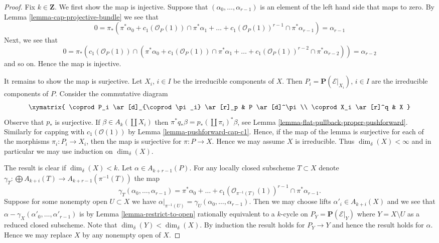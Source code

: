\begin{proof}
Fix $k \in \mathbf{Z}$. We first show the map is injective.
Suppose that $(\alpha_0, \ldots, \alpha_{r - 1})$ is an element
of the left hand side that maps to zero.
By Lemma \ref{lemma-cap-projective-bundle} we see that
$$
0 = \pi_*(\pi^*\alpha_0 +
c_1(\mathcal{O}_P(1)) \cap \pi^*\alpha_1
+ \ldots +
c_1(\mathcal{O}_P(1))^{r - 1} \cap \pi^*\alpha_{r-1})
= \alpha_{r - 1}
$$
Next, we see that
$$
0 = \pi_*(c_1(\mathcal{O}_P(1)) \cap (\pi^*\alpha_0 +
c_1(\mathcal{O}_P(1)) \cap \pi^*\alpha_1
+ \ldots +
c_1(\mathcal{O}_P(1))^{r - 2} \cap \pi^*\alpha_{r - 2}))
= \alpha_{r - 2}
$$
and so on. Hence the map is injective.

\medskip\noindent
It remains to show the map is surjective.
Let $X_i$, $i \in I$ be the irreducible components of $X$.
Then $P_i = \mathbf{P}(\mathcal{E}|_{X_i})$, $i \in I$
are the irreducible components of $P$. Consider the commutative
diagram
$$
\xymatrix{
\coprod P_i \ar[d]_{\coprod \pi_i} \ar[r]_p & P \ar[d]^\pi \\
\coprod X_i \ar[r]^q & X
}
$$
Observe that $p_*$ is surjective. If $\beta \in A_k(\coprod X_i)$
then $\pi^* q_* \beta = p_*(\coprod \pi_i)^* \beta$, see
Lemma \ref{lemma-flat-pullback-proper-pushforward}. Similarly for
capping with $c_1(\mathcal{O}(1))$ by
Lemma \ref{lemma-pushforward-cap-c1}.
Hence, if the map of the lemma is surjective for each
of the morphisms $\pi_i : P_i \to X_i$, then the map is
surjective for $\pi : P \to X$. Hence we may assume $X$ is irreducible.
Thus $\dim_\delta(X) < \infty$ and in particular we may use
induction on $\dim_\delta(X)$.

\medskip\noindent
The result is clear if $\dim_\delta(X) < k$.
Let $\alpha \in A_{k + r - 1}(P)$.
For any locally closed subscheme $T \subset X$ denote
$\gamma_T : \bigoplus A_{k + i}(T) \to A_{k + r - 1}(\pi^{-1}(T))$
the map
$$
\gamma_T(\alpha_0, \ldots, \alpha_{r - 1})
= \pi^*\alpha_0 + \ldots +
c_1(\mathcal{O}_{\pi^{-1}(T)}(1))^{r - 1} \cap \pi^*\alpha_{r - 1}.
$$
Suppose for some nonempty open $U \subset X$ we have
$\alpha|_{\pi^{-1}(U)} = \gamma_U(\alpha_0, \ldots, \alpha_{r - 1})$.
Then we may choose lifts $\alpha'_i \in A_{k + i}(X)$ and we
see that $\alpha - \gamma_X(\alpha'_0, \ldots, \alpha'_{r - 1})$
is by Lemma \ref{lemma-restrict-to-open}
rationally equivalent to a $k$-cycle on $P_Y = \mathbf{P}(\mathcal{E}|_Y)$
where $Y = X \setminus U$ as a reduced closed subscheme.
Note that $\dim_\delta(Y) < \dim_\delta(X)$.
By induction the result holds
for $P_Y \to Y$ and hence the result holds for $\alpha$.
Hence we may replace $X$ by any nonempty open of $X$.


\end{proof}
